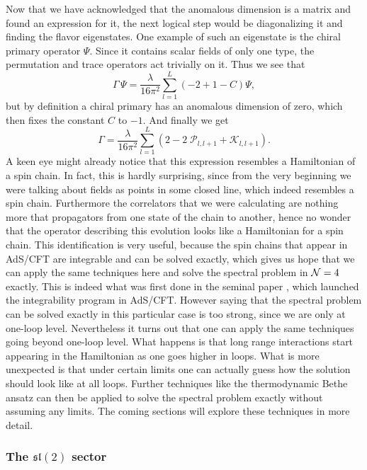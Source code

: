 Now that we have acknowledged that the anomalous dimension is a matrix and found an expression for it, the next logical step would be diagonalizing it and finding the flavor eigenstates. One example of such an eigenstate is the chiral primary operator $\Psi$. Since it contains scalar fields of only one type, the permutation and trace operators act trivially on it. Thus we see that
\begin{equation}
	\Gamma \, \Psi = \frac{\lambda}{16\pi^2}\sum_{l=1}^L \left( -2 + 1 - C \right) \Psi,
\end{equation}
but by definition a chiral primary has an anomalous dimension of zero, which then fixes the constant $C$ to $-1$. And finally we get
\begin{equation}
	\Gamma = \frac{\lambda}{16\pi^2}\sum_{l=1}^L \left(2 - 2 \; \mathcal{P}_{l,l+1} + \mathcal{K}_{l,l+1} \right).
\end{equation}
A keen eye might already notice that this expression resembles a Hamiltonian of a spin chain. In fact, this is hardly surprising, since from the very beginning we were talking about fields as points in some closed line, which indeed resembles a spin chain. Furthermore the correlators that we were calculating are nothing more that propagators from one state of the chain to another, hence no wonder that the operator describing this evolution looks like a Hamiltonian for a spin chain. This identification is very useful, because the spin chains that appear in AdS/CFT are integrable and can be solved exactly, which gives us hope that we can apply the same techniques here and solve the spectral problem in $\mathcal{N}=4$ exactly. This is indeed what was first done in the seminal paper \cite{minahan_original}, which launched the integrability program in AdS/CFT. However saying that the spectral problem can be solved exactly in this particular case is too strong, since we are only at one-loop level. Nevertheless it turns out that one can apply the same techniques going beyond one-loop level. What happens is that long range interactions start appearing in the Hamiltonian as one goes higher in loops. What is more unexpected is that under certain limits one can actually guess how the solution should look like at all loops. Further techniques like the thermodynamic Bethe ansatz can then be applied to solve the spectral problem exactly without assuming any limits. The coming sections will explore these techniques in more detail.


\subsubsection{The $\mathfrak{sl}(2)$ sector}



